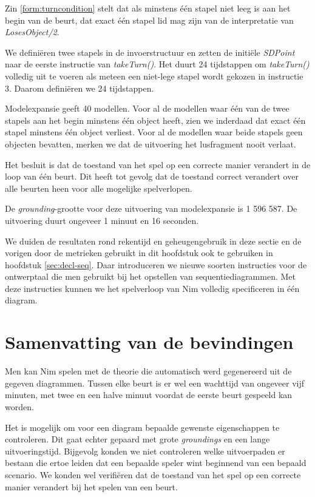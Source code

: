 Zin \ref{form:turncondition} stelt dat als minstens \'e\'en stapel niet leeg is aan het begin van de beurt, dat exact \'e\'en stapel lid mag zijn van de interpretatie van \textit{LosesObject/2}.

We defini\"eren twee stapels in de invoerstructuur en zetten de initi\"ele \textit{SDPoint} naar de eerste instructie van \textit{takeTurn()}. Het duurt 24 tijdstappen om \textit{takeTurn()} volledig uit te voeren als meteen een niet-lege stapel wordt gekozen in instructie 3. Daarom defini\"eren we 24 tijdstappen.

Modelexpansie geeft 40 modellen. Voor al de modellen waar \'e\'en van de twee stapels aan het begin minstens \'e\'en object heeft, zien we inderdaad dat exact \'e\'en stapel minstens \'e\'en object verliest. Voor al de modellen waar beide stapels geen objecten bevatten, merken we dat de uitvoering het lusfragment nooit verlaat.

Het besluit is dat de toestand van het spel op een correcte manier verandert in de loop van \'e\'en beurt. Dit heeft tot gevolg dat de toestand correct verandert over alle beurten heen voor alle mogelijke spelverlopen.

De \textit{grounding}-grootte voor deze uitvoering van modelexpansie is 1 596 587. De uitvoering duurt ongeveer 1 minuut en 16 seconden. 

We duiden de resultaten rond rekentijd en geheugengebruik in deze sectie en de vorigen door de metrieken gebruikt in dit hoofdstuk ook te gebruiken in hoofdstuk \ref{sec:decl-seq}. Daar introduceren we nieuwe soorten instructies voor de ontwerptaal die men gebruikt bij het opstellen van sequentiediagrammen. Met deze instructies kunnen we het spelverloop van Nim volledig specificeren in \'e\'en diagram.

\section{Samenvatting van de bevindingen}
Men kan Nim spelen met de theorie die automatisch werd gegenereerd uit de gegeven diagrammen. Tussen elke beurt is er wel een wachttijd van ongeveer vijf minuten, met twee en een halve minuut voordat de eerste beurt gespeeld kan worden.

Het is mogelijk om voor een diagram bepaalde gewenste eigenschappen te controleren. Dit gaat echter gepaard met grote \textit{groundings} en een lange uitvoeringstijd. Bijgevolg konden we niet controleren welke uitvoerpaden er bestaan die ertoe leiden dat een bepaalde speler wint beginnend van een bepaald scenario. We konden wel verifi\"eren dat de toestand van het spel op een correcte manier verandert bij het spelen van een beurt.

